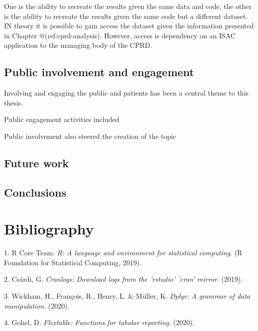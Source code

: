 \documentclass[a4paper, twoside]{templates/ociamthesis}
\begin{document}
One is the ability to recreate the results given the same data and code, the other is the ability to recreate the results given the same code but a different dataset. IN theory it is possible to gain access the dataset given the information presented in Chapter @(ref:cprd-analysis). However, access is dependency on an ISAC application to the managing body of the CPRD.

\hypertarget{public-involvement-and-engagement}{%
\section{Public involvement and engagement}\label{public-involvement-and-engagement}}

Involving and engaging the public and patients has been a central theme to this thesis.

Public engagement activities included

Public involvement also steered the creation of the topic

\hypertarget{future-work}{%
\section{Future work}\label{future-work}}

\hypertarget{conclusions}{%
\section{Conclusions}\label{conclusions}}

\hypertarget{bibliography}{%
\chapter{Bibliography}\label{bibliography}}

\hypertarget{refs}{}
\leavevmode\hypertarget{ref-base}{}%
1. R Core Team. \emph{R: A language and environment for statistical computing}. (R Foundation for Statistical Computing, 2019).

\leavevmode\hypertarget{ref-cranlogs}{}%
2. Csárdi, G. \emph{Cranlogs: Download logs from the 'rstudio' 'cran' mirror}. (2019).

\leavevmode\hypertarget{ref-dplyr}{}%
3. Wickham, H., François, R., Henry, L. \& Müller, K. \emph{Dplyr: A grammar of data manipulation}. (2020).

\leavevmode\hypertarget{ref-flextable}{}%
4. Gohel, D. \emph{Flextable: Functions for tabular reporting}. (2020).
\end{document}
